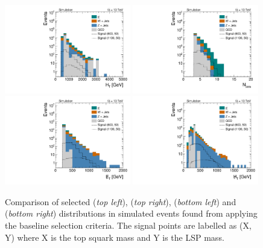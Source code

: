 \begin{figure}[!t]
  \centering
  \begin{minipage}[c]{1.\textwidth}
    \begin{center}
      \includegraphics[width=0.49\textwidth]{figures/Stop_DeltaPhiSelection_HThad.pdf}  
      \includegraphics[width=0.49\textwidth]{figures/Stop_DeltaPhiSelection_N_jets.pdf} \\
      \includegraphics[width=0.49\textwidth]{figures/Stop_DeltaPhiSelection_MET.pdf} 
      \includegraphics[width=0.49\textwidth]{figures/Stop_DeltaPhiSelection_MHT.pdf} 
    \end{center}
  \end{minipage}

  \caption{Comparison of selected \HT (\textit{top left}), \NJets (\textit{top right}), \met (\textit{bottom left}) and \MHT (\textit{bottom right}) distributions in simulated events found from applying the baseline selection criteria. The signal points are labelled as (X, Y) where X is the top squark mass and Y is the LSP mass.}
  \label{fig:stop_baseline} 
\end{figure}
